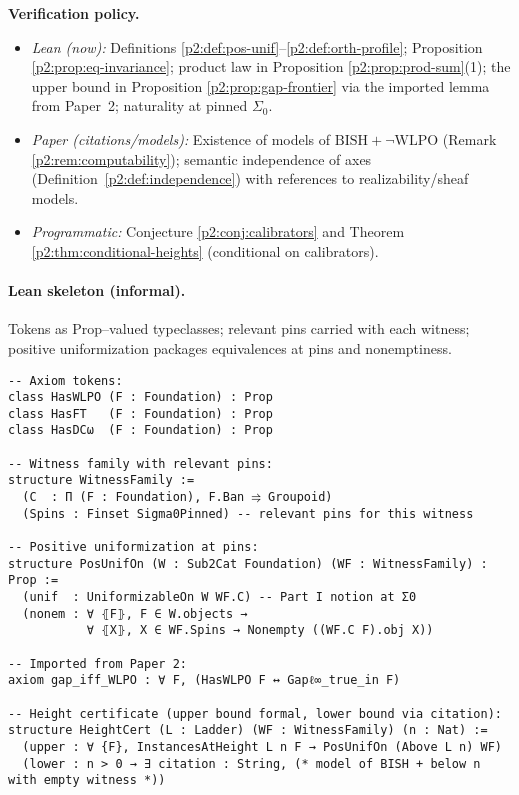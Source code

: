 \documentclass[11pt]{article}
\theoremstyle{definition}
\theoremstyle{remark}
\newcommand{\WLPO}{\mathrm{WLPO}}
\newcommand{\BISH}{\mathrm{BISH}}
\newcommand{\SigmaZero}{\Sigma_{0}}
\begin{document}
\begin{mdframed}[style=status]
\textbf{Verification policy.}
\begin{itemize}
\item \emph{Lean (now):} Definitions \ref{p2:def:pos-unif}--\ref{p2:def:orth-profile}; Proposition \ref{p2:prop:eq-invariance}; product law in Proposition \ref{p2:prop:prod-sum}(1); the upper bound in Proposition \ref{p2:prop:gap-frontier} via the imported lemma from Paper~2; naturality at pinned \(\SigmaZero\).
\item \emph{Paper (citations/models):} Existence of models of \(\BISH+\neg\WLPO\) (Remark \ref{p2:rem:computability}); semantic independence of axes (Definition~\ref{p2:def:independence}) with references to realizability/sheaf models.
\item \emph{Programmatic:} Conjecture \ref{p2:conj:calibrators} and Theorem \ref{p2:thm:conditional-heights} (conditional on calibrators).
\end{itemize}
\end{mdframed}

\paragraph{Lean skeleton (informal).}
Tokens as Prop--valued typeclasses; relevant pins carried with each witness; positive uniformization packages equivalences at pins and nonemptiness.

\begin{verbatim}
-- Axiom tokens:
class HasWLPO (F : Foundation) : Prop
class HasFT   (F : Foundation) : Prop
class HasDCω  (F : Foundation) : Prop

-- Witness family with relevant pins:
structure WitnessFamily :=
  (C  : Π (F : Foundation), F.Ban ⥤ Groupoid)
  (Spins : Finset Sigma0Pinned) -- relevant pins for this witness

-- Positive uniformization at pins:
structure PosUnifOn (W : Sub2Cat Foundation) (WF : WitnessFamily) : Prop :=
  (unif  : UniformizableOn W WF.C) -- Part I notion at Σ0
  (nonem : ∀ ⦃F⦄, F ∈ W.objects →
           ∀ ⦃X⦄, X ∈ WF.Spins → Nonempty ((WF.C F).obj X))

-- Imported from Paper 2:
axiom gap_iff_WLPO : ∀ F, (HasWLPO F ↔ Gapℓ∞_true_in F)

-- Height certificate (upper bound formal, lower bound via citation):
structure HeightCert (L : Ladder) (WF : WitnessFamily) (n : Nat) :=
  (upper : ∀ {F}, InstancesAtHeight L n F → PosUnifOn (Above L n) WF)
  (lower : n > 0 → ∃ citation : String, (* model of BISH + below n with empty witness *))
\end{verbatim}
\end{document}

